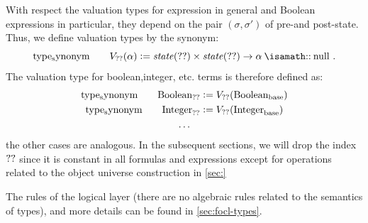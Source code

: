 With respect the valuation types for \OCL expression in general and Boolean expressions in
particular, they depend on the pair $(\sigma, \sigma')$ of pre-and post-state.  
Thus, we define valuation types by the synonym:
\begin{equation}
\typesynonym \qquad  \V{\Alpha}{\alpha} \defeq \state{\Alpha} \times \state{\Alpha} \to \alpha \ofType \TCnull \mi{.}
\end{equation}
The valuation type for boolean,integer, etc. \OCL terms is therefore defined as:
\begin{gather*}
\mathrm{type_synonym} \qquad \text{Boolean}_{??} \mathrel{\mathop:}=  V_{??}({\text{Boolean}_{\text{base}}}) \\
\mathrm{type_synonym} \qquad \text{Integer}_{??} \mathrel{\mathop:}=  V_{??}({\text{Integer}_{\text{base}}}) \\
\ldots \\
\end{gather*}
the other cases are analogous. In the subsequent sections, we will drop the index $??$ since
it is constant in all formulas and expressions except for operations related to the object universe
construction in \autoref{sec:}

The rules of the logical layer (there are no algebraic rules related to the semantics of types),
and more details can be found in  \autoref{sec:focl-types}.

